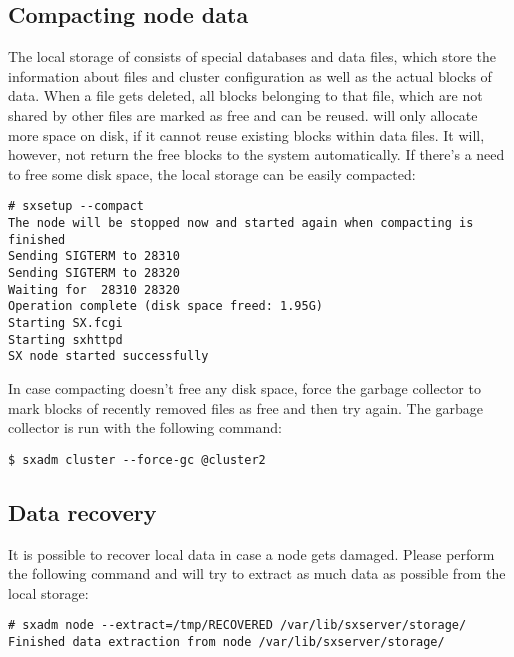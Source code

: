 \subsection{Compacting node data}
The local storage of \SX consists of special databases and data files, which
store the information about files and cluster configuration as well as the
actual blocks of data. When a file gets deleted, all blocks belonging
to that file, which are not shared by other files are marked as free and
can be reused. \SX will only allocate more space on disk, if it cannot reuse
existing blocks within data files. It will, however, not return the free blocks
to the system automatically. If there's a need to free some disk space, the
local storage can be easily compacted:
\begin{lstlisting}
# sxsetup --compact
The node will be stopped now and started again when compacting is finished
Sending SIGTERM to 28310
Sending SIGTERM to 28320
Waiting for  28310 28320
Operation complete (disk space freed: 1.95G)
Starting SX.fcgi
Starting sxhttpd
SX node started successfully
\end{lstlisting}
In case compacting doesn't free any disk space, force the garbage collector
to mark blocks of recently removed files as free and then try again. The
garbage collector is run with the following command:
\begin{lstlisting}
$ sxadm cluster --force-gc @cluster2
\end{lstlisting}

\subsection{Data recovery}
It is possible to recover local data in case a node gets damaged. Please
perform the following command and  will try to extract as
much data as possible from the local storage:
\begin{lstlisting}
# sxadm node --extract=/tmp/RECOVERED /var/lib/sxserver/storage/
Finished data extraction from node /var/lib/sxserver/storage/
\end{lstlisting}
